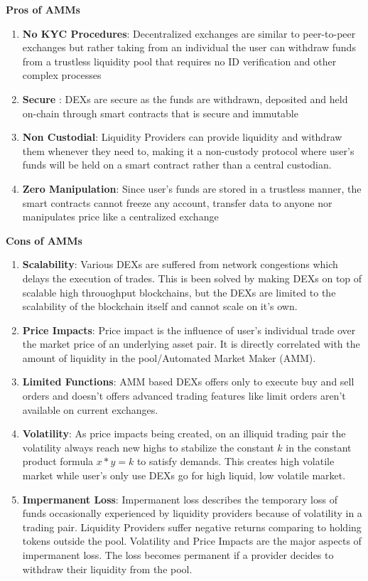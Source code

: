 \documentclass[10pt]{article}
\begin{document}
\textbf{Pros of AMMs}
\begin{enumerate}[leftmargin=+0.2in]
\item \textbf{No KYC Procedures}: Decentralized exchanges are similar to peer-to-peer exchanges but rather taking from an individual the user can withdraw funds from a trustless liquidity pool that requires no ID verification and other complex processes
\item \textbf{Secure} : DEXs are secure as the funds are withdrawn, deposited and held on-chain through smart contracts that is secure and immutable
\item \textbf{Non Custodial}: Liquidity Providers can provide liquidity and withdraw them whenever they need to, making it a non-custody protocol where user's funds will be held on a smart contract rather than a central custodian.
\item \textbf{Zero Manipulation}: Since user's funds are stored in a trustless manner, the smart contracts cannot freeze any account, transfer data to anyone nor manipulates price like a centralized exchange
\end{enumerate}

\textbf{Cons of AMMs}
\begin{enumerate}[leftmargin=+0.2in]
\item \textbf{Scalability}: Various DEXs are suffered from network congestions which delays the execution of trades. This is been solved by making DEXs on top of scalable high throuoghput blockchains, but the DEXs are limited to the scalability of the blockchain itself and cannot scale on it's own.
\item \textbf{Price Impacts}: Price impact is the influence of user's individual trade over the market price of an underlying asset pair. It is directly correlated with the amount of liquidity in the pool/Automated Market Maker (AMM).
\item \textbf{Limited Functions}: AMM based DEXs offers only to execute buy and sell orders and doesn't offers advanced trading features like limit orders aren't available on current exchanges.
\item \textbf{Volatility}: As price impacts being created, on an illiquid trading pair the volatility always reach new highs to stabilize the constant $k$ in the constant product formula $x*y=k$ to satisfy demands. This creates high volatile market while user's only use DEXs go for high liquid, low volatile market.
\item \textbf{Impermanent Loss}: Impermanent loss describes the temporary loss of funds occasionally experienced by liquidity providers because of volatility in a trading pair. Liquidity Providers suffer negative returns comparing to holding tokens outside the pool. Volatility and Price Impacts are the major aspects of impermanent loss. The loss becomes permanent if a provider decides to withdraw their liquidity from the pool.
\end{enumerate}
\end{document}

